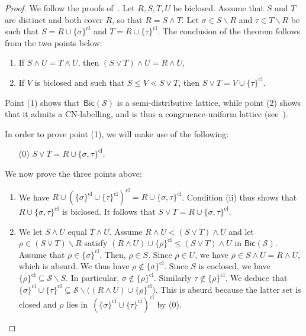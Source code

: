 \documentclass{amsart}
\theoremstyle{definition}
\newcommand{\cS}{\mathcal{S}} %
\newcommand{\ssm}{\smallsetminus} %
\newcommand{\closure}[1]{#1^{\mathrm{cl}}} %
\newcommand{\Bicl}[1]{\mathsf{Bic}(#1)} %
\begin{document}
\begin{proof}
We follow the proofs of~\cite[Thm.~5.2 \& Thm.~5.5]{McConville}. 
Let $R,S,T,U$ be biclosed.
Assume that $S$ and $T$ are distinct and both cover $R$, so that $R = S \wedge T$.
Let $\sigma \in S\ssm R$ and $\tau \in T \ssm R$ be such that $S = R \cup \closure{\{\sigma\}}$ and $T = R \cup \closure{\{\tau\}}$.
The conclusion of the theorem follows from the two points below:
\begin{enumerate}
 \item If $S \wedge U = T \wedge U$, then $(S\vee T) \wedge U = R \wedge U$,
 \item If $V$ is biclosed and such that $S \leq V \lessdot S \vee T$, then $S\vee T = V \cup \closure{\{\tau\}}$.
\end{enumerate}
Point (1) shows that~$\Bicl{\cS}$ is a semi-distributive lattice, while point (2) shows that it admits a CN-labelling, and is thus a congruence-uniform lattice (see~\cite[Thm.~4]{Reading-HyperplaneArrangement}).

In order to prove point (1), we will make use of the following:
\begin{itemize}
 \item[(0)] $S\vee T = R\cup\closure{\{\sigma,\tau\}}$.
\end{itemize}

We now prove the three points above:

\begin{enumerate}
\item We have $R \cup \closure{(\closure{\{\sigma\}} \cup \closure{\{\tau\}} )} =   R \cup \closure{\{\sigma,\tau\}}$.
Condition (ii) thus shows that $R \cup \closure{\{\sigma,\tau\}}$ is biclosed.
It follows that $S\vee T = R \cup \closure{\{\sigma,\tau\}}$.

\item We let $S\wedge U$ equal $T\wedge U$. Assume $R\wedge U < (S\vee T)\wedge U$ and let $\rho \in (S\vee T) \ssm R$ satisfy $(R\wedge U) \cup \closure{\{\rho\}} \leq (S\vee T)\wedge U$ in $\Bicl{\cS}$.
Assume that $\rho\in\closure{\{\sigma\}}$.
Then, $\rho\in S$.
Since $\rho\in U$, we have ${\rho \in S \wedge U = R \wedge U}$, which is absurd.
We thus have $\rho \notin \closure{\{\sigma\}}$.
Since $S$ is coclosed, we have $\closure{\{\rho\}} \subseteq \cS\ssm S$.
In particular, $\sigma \notin \closure{\{\rho\}}$.
Similarly $\tau \notin \closure{\{\rho\}}$.
We deduce that ${\closure{\{\sigma\}} \cup \closure{\{\tau\}} \subseteq \cS\ssm \big( (R\wedge U) \cup \closure{\{\rho\}} \big)}$.
This is absurd because the latter set is closed and $\rho$ lies in~$\closure{( \closure{\{\sigma\}} \cup \closure{\{\tau\}} )}$ by (0).


\end{enumerate}
\end{proof}
\end{document}
